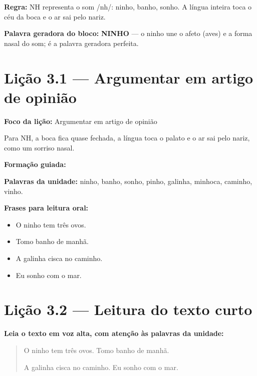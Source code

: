 \textbf{Regra:} NH representa o som /nh/: ninho, banho, sonho. A língua inteira toca o céu da boca e o ar sai pelo nariz.

\textbf{Palavra geradora do bloco:} \textbf{NINHO} --- o ninho une o afeto (aves) e a forma nasal do som; é a palavra geradora perfeita.

\section{Lição 3.1 --- Argumentar em artigo de opinião}

\textbf{Foco da lição:} Argumentar em artigo de opinião


\begin{boquinha}
Para NH, a boca fica quase fechada, a língua toca o palato e o ar sai pelo nariz, como um sorriso nasal.
\end{boquinha}

\noindent\textbf{Formação guiada:}

\begin{center}
\end{center}

\noindent\textbf{Palavras da unidade:} ninho, banho, sonho, pinho, galinha, minhoca, caminho, vinho.

\noindent\textbf{Frases para leitura oral:}
\begin{itemize}[leftmargin=1.6em]
  \item O ninho tem três ovos.
  \item Tomo banho de manhã.
  \item A galinha cisca no caminho.
  \item Eu sonho com o mar.
\end{itemize}

\section{Lição 3.2 --- Leitura do texto curto}

\noindent\textbf{Leia o texto em voz alta, com atenção às palavras da unidade:}


\begin{quote}
O ninho tem três ovos. Tomo banho de manhã.

A galinha cisca no caminho. Eu sonho com o mar.
\end{quote}

